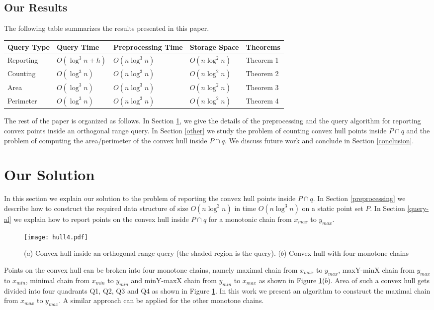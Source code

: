 \documentclass[runningheads,a4paper]{llncs}
\begin{document}
\subsection{Our Results} \label{our-results}
The following table summarizes the results presented in this paper.
\begin{center}
    \begin{tabular}{ | l | l | l | l | p{2cm} |}
    \hline
    \textbf{Query Type} & \textbf{Query Time} & \textbf{Preprocessing Time} &  \textbf{Storage Space} & \textbf{Theorems} \\ \hline
    Reporting & $O(\log^{3} n + h)$ & $O(n \log^{3} n)$ & $O(n \log^{2} n)$ & Theorem 1 \\ \hline
    Counting & $O(\log^{3} n)$ & $O(n \log^{3} n)$ & $O(n \log^{2} n)$ & Theorem 2 \\ \hline
    Area & $O(\log^{3} n)$ & $O(n \log^{3} n)$ & $O(n \log^{2} n)$ & Theorem 3 \\ \hline
    Perimeter & $O(\log^{3} n)$ & $O(n \log^{3} n)$ & $O(n \log^{2} n)$ & Theorem 4 \\ \hline
    \hline
    \end{tabular}
\end{center}
The rest of the paper is organized as follows. In Section \ref{Basic idea}, we
give the details of the preprocessing and the query algorithm for reporting
convex points inside an orthogonal range query. In Section \ref{other} we
study the problem of counting convex hull points inside $P \cap q$ and the
problem of computing the area/perimeter of the convex hull inside $P \cap
q$. We discuss future work and conclude in Section \ref{conclusion}.
\section{Our Solution}\label{Basic idea}
In this section we explain our solution to the problem of reporting the convex hull points inside $P \cap q$.
In Section \ref{preprocessing} we describe how to construct the required data structure of 
size $O(n \log^{2} n)$ in time $O(n \log^{3} n)$ on a static point set $P$.
In Section \ref{query-al} we explain how to report points on the convex hull inside $P \cap q$ for a monotonic chain from $x_{max}$ to $y_{max}$.
\begin{figure}
\vspace{-0.5cm}
\centering
\texttt{[image: hull4.pdf]}
\caption{($a$) Convex hull inside an orthogonal range query (the shaded region is
  the query). ($b$) Convex hull with four monotone chains}
\label{fig1}
\vspace{-0.5cm}
\end{figure}
Points on the convex hull can be broken into four monotone chains, namely
maximal chain from $x_{max}$ to $y_{max}$, maxY-minX chain from $y_{max}$
to $x_{min}$, minimal chain from $x_{min}$ to $y_{min}$ and
minY-maxX chain from $y_{min}$ to $x_{max}$ as shown in Figure \ref{fig1}($b$).
Area of such a convex hull gets divided into four quadrants Q1, Q2, Q3 and Q4 as shown in Figure \ref{fig1}.
In this work we present an algorithm to construct the maximal chain from
$x_{max}$ to $y_{max}$.  A similar approach can be applied for the other
monotone chains.
\end{document}
